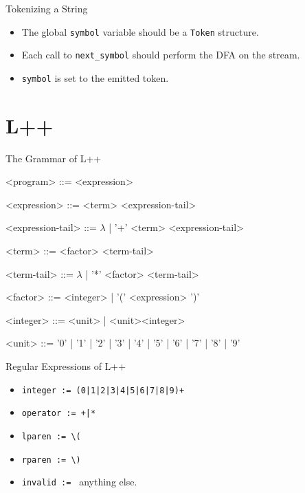 \documentclass[]{beamer}
\begin{document}
\begin{frame}{Tokenizing a String}
    \begin{itemize}[<+->]
        \item The global \texttt{symbol} variable should be
            a \texttt{Token} structure.
        \item Each call to \texttt{next\_symbol} should perform the 
            DFA on the stream.
        \item \texttt{symbol} is set to the emitted token.
    \end{itemize}
\end{frame}


\section{L++}

\begin{frame}{The Grammar of L++}
\begin{grammar}
    <program> ::= <expression>

    <expression> ::= <term> <expression-tail>
    
    <expression-tail> ::= $\lambda$ | '+' <term> <expression-tail>
    
    <term> ::= <factor> <term-tail>
    
    <term-tail> ::= $\lambda$ | '*' <factor> <term-tail>
    
    <factor> ::= <integer> | '(' <expression> ')'

    <integer> ::= <unit> | <unit><integer>
    
    <unit> ::= '0' | '1' | '2' | '3' | '4' | '5' | '6' | '7' | '8'
    | '9'
\end{grammar}
\end{frame}


\begin{frame}[fragile]{Regular Expressions of L++}
    \begin{itemize}[<+->]
        \item \verb!integer := (0|1|2|3|4|5|6|7|8|9)+!
        \item \verb!operator := +|*!
        \item \verb!lparen := \(!
        \item \verb!rparen := \)!
        \item \verb!invalid := ! anything else.
    \end{itemize}
\end{frame}
\end{document}
